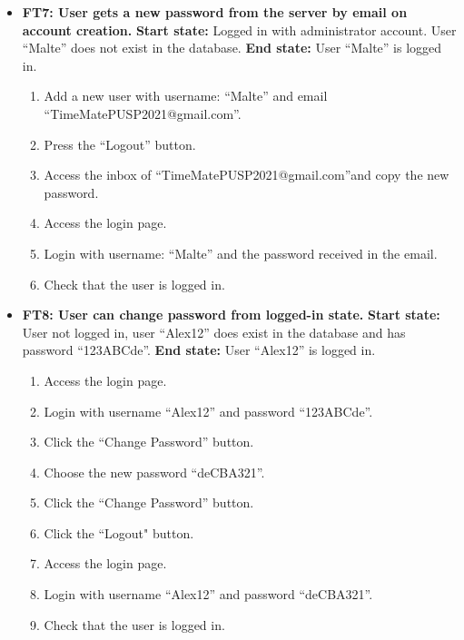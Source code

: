 \documentclass{article}
\begin{document}
\begin{itemize}
		\item \textbf{FT7: User gets a new password from the server by email on account creation. } \newline
		\textbf{Start state:} Logged in with administrator account. User “Malte” does not exist in the database.  \newline
		\textbf{End state:}  User “Malte” is logged in.  
		\begin{enumerate}
			\item Add a new user with username: “Malte” and email “TimeMatePUSP2021@gmail.com”.
			\item Press the “Logout” button. 
			\item Access the inbox of “TimeMatePUSP2021@gmail.com”and copy the new password.
			\item Access the login page.
			\item Login with username: “Malte” and the password received in the email.
			\item Check that the user is logged in.
		\end{enumerate}
		
		\item \textbf{FT8: User can change password from logged-in state.} \newline
		\textbf{Start state:} User not logged in, user “Alex12” does exist in the database and has password “123ABCde”. \newline
		\textbf{End state:} User “Alex12” is logged in. 
		\begin{enumerate}
			\item Access the login page.
			\item Login with username “Alex12” and password “123ABCde”.
			\item Click the “Change Password” button.
			\item Choose the new password “deCBA321”.
			\item Click the “Change Password” button.
			\item Click the “Logout" button.
			\item Access the login page.
			\item Login with username “Alex12” and password “deCBA321”.
			\item Check that the user is logged in.
		\end{enumerate}
		

\end{itemize}
\end{document}
